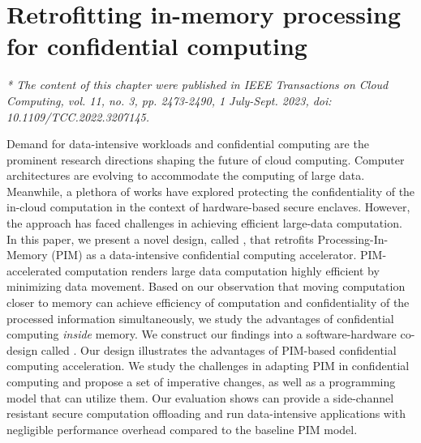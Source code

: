 \chapter{Retrofitting in-memory processing for confidential computing}

\emph{* The content of this chapter were published in IEEE Transactions on Cloud Computing, vol. 11, no. 3, pp. 2473-2490, 1 July-Sept. 2023, doi: 10.1109/TCC.2022.3207145.}
\\

\label{chap:sepim}

\newcommand{\thename}{TITLE HERE}
\renewcommand{\thename}{\sepim}
\newcommand{\baseline}{\textsc{Baseline}\xspace}
\newcommand{\hdr}{\subsubsection}
Demand for data-intensive workloads and confidential computing are the prominent research directions shaping the future of cloud computing. Computer architectures are evolving to accommodate the computing of large data. Meanwhile, a plethora of works have explored protecting the confidentiality of the in-cloud computation in the context of hardware-based secure enclaves. However, the approach has faced challenges in achieving efficient large-data computation. In this paper, we present a novel design, called \thename, that retrofits Processing-In-Memory (PIM) as a data-intensive confidential computing accelerator. PIM-accelerated computation renders large data computation highly efficient by minimizing data movement. Based on our observation that moving computation closer to memory can achieve efficiency of computation and confidentiality of the processed information simultaneously, we study the advantages of confidential computing \emph{inside} memory. We construct our findings into a software-hardware co-design called \thename. Our design illustrates the advantages of PIM-based confidential computing acceleration. We study the challenges in adapting PIM in confidential computing and propose a set of imperative changes, as well as a programming model that can utilize them. Our evaluation shows \thename can provide a side-channel resistant secure computation offloading and run data-intensive applications with negligible performance overhead compared to the baseline PIM model.

